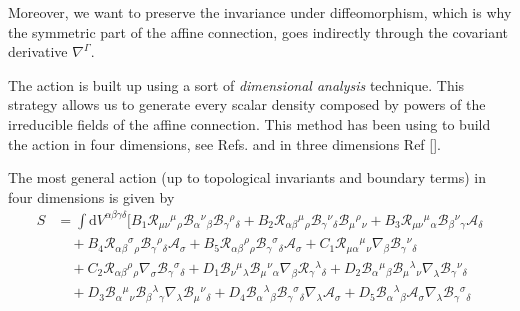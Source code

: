 \documentclass{article}
\begin{document}
Moreover, we want to preserve the invariance under diffeomorphism, 
which is why the symmetric part of the affine connection, goes 
indirectly through the covariant derivative $\nabla^\Gamma$. 

The action is built up using a sort of \textit{dimensional analysis}
technique. This strategy allows us to generate every scalar density
composed by powers of the irreducible fields of the affine connection.
This method has been using to build the action in four dimensions, see
Refs. and in three dimensions Ref [].

The most general action (up to topological invariants and boundary terms) 
in four dimensions is given by
\begin{equation}
    \label{PAG_action}
    \begin{split}
    S
    & =
    \int  \mathrm{d}V^{\alpha \beta \gamma \delta} \bigg[
    B_1 \mathcal{R}_{\mu\nu}{}^{\mu}{}_{\rho}\mathcal{B}_{\alpha}{}^{\nu}{}_{\beta}\mathcal{B}_{\gamma}{}^{\rho}{}_{\delta}
    + B_2 \mathcal{R}_{\alpha\beta}{}^{\mu}{}_{\rho} \mathcal{B}_{\gamma}{}^{\nu}{}_{\delta} \mathcal{B}_{\mu}{}^{\rho}{}_{\nu}
    + B_3 \mathcal{R}_{\mu\nu}{}^{\mu}{}_{\alpha} \mathcal{B}_{\beta}{}^{\nu}{}_{\gamma} \mathcal{A}_\delta
    \\
    & \quad
    + B_4 \mathcal{R}_{\alpha\beta}{}^{\sigma}{}_{\rho}\mathcal{B}_{\gamma}{}^{\rho}{}_{\delta}\mathcal{A}_\sigma
    + B_5 \mathcal{R}_{\alpha \beta}{}^{\rho}{}_{\rho} \mathcal{B}_{\gamma}{}^{\sigma}{}_{\delta} \mathcal{A}_\sigma
    + C_1 \mathcal{R}_{\mu\alpha}{}^{\mu}{}_{\nu} \nabla_\beta \mathcal{B}_{\gamma}{}^{\nu}{}_{\delta}
    \\
    & \quad
    + C_2 \mathcal{R}_{\alpha\beta}{}^{\rho}{}_{\rho} \nabla_\sigma \mathcal{B}_{\gamma}{}^{\sigma}{}_{\delta}
    + D_1 \mathcal{B}_{\nu}{}^{\mu}{}_{\lambda} \mathcal{B}_{\mu}{}^{\nu}{}_{\alpha} \nabla_\beta \mathcal{R}_{\gamma}{}^{\lambda}{}_{\delta}
    + D_2 \mathcal{B}_{\alpha}{}^{\mu}{}_{\beta} \mathcal{B}_{\mu}{}^{\lambda}{}_{\nu} \nabla_{\lambda} \mathcal{B}_{\gamma}{}^{\nu}{}_{\delta}
    \\
    & \quad
    + D_3 \mathcal{B}_{\alpha}{}^{\mu}{}_{\nu}\mathcal{B}_{\beta}{}^{\lambda}{}_{\gamma} \nabla_\lambda \mathcal{B}_{\mu}{}^{\nu}{}_{\delta}
    + D_4 \mathcal{B}_{\alpha}{}^{\lambda}{}_{\beta}\mathcal{B}_{\gamma}{}^{\sigma}{}_{\delta}\nabla_\lambda \mathcal{A}_\sigma
    + D_5 \mathcal{B}_{\alpha}{}^{\lambda}{}_{\beta} \mathcal{A}_\sigma \nabla_\lambda \mathcal{B}_{\gamma}{}^{\sigma}{}_{\delta}
    \\

\end{split}
\end{equation}
\end{document}
